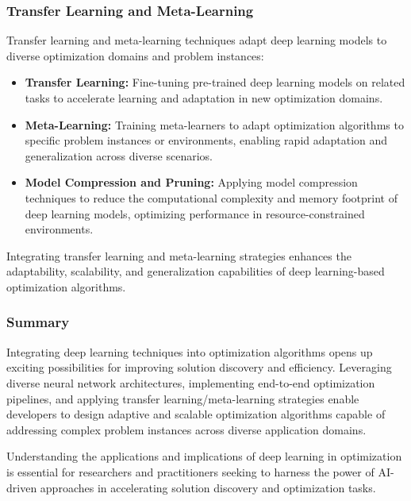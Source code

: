 \documentclass[11pt]{report}
\begin{document}
        \subsubsection{Transfer Learning and Meta-Learning}
        Transfer learning and meta-learning techniques adapt deep learning models to diverse optimization domains and problem instances:

        \begin{itemize}
            \item \textbf{Transfer Learning:} Fine-tuning pre-trained deep learning models on related tasks to accelerate learning and adaptation in new optimization domains.
        
            \item \textbf{Meta-Learning:} Training meta-learners to adapt optimization algorithms to specific problem instances or environments, enabling rapid adaptation and generalization across diverse scenarios.
        
            \item \textbf{Model Compression and Pruning:} Applying model compression techniques to reduce the computational complexity and memory footprint of deep learning models, optimizing performance in resource-constrained environments.
        \end{itemize}
        Integrating transfer learning and meta-learning strategies enhances the adaptability, scalability, and generalization capabilities of deep learning-based optimization algorithms.
        \subsubsection{Summary}
        Integrating deep learning techniques into optimization algorithms opens up exciting possibilities for improving solution discovery and efficiency. Leveraging diverse neural network architectures, implementing end-to-end optimization pipelines, and applying transfer learning/meta-learning strategies enable developers to design adaptive and scalable optimization algorithms capable of addressing complex problem instances across diverse application domains.

        Understanding the applications and implications of deep learning in optimization is essential for researchers and practitioners seeking to harness the power of AI-driven approaches in accelerating solution discovery and optimization tasks.

\pagebreak
\end{document}
